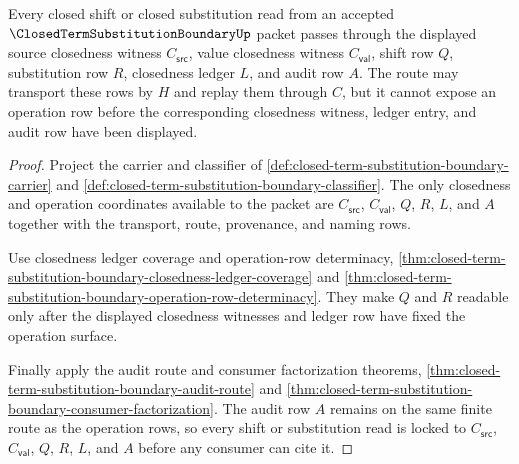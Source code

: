 \begin{theorem}
\label{thm:closed-term-substitution-boundary-shift-substitution-ledger-lock}
Every closed shift or closed substitution read from an accepted $\ClosedTermSubstitutionBoundaryUp$ packet passes through the displayed source closedness witness $C_{\mathsf{src}}$, value closedness witness $C_{\mathsf{val}}$, shift row $Q$, substitution row $R$, closedness ledger $L$, and audit row $A$. The route may transport these rows by $H$ and replay them through $C$, but it cannot expose an operation row before the corresponding closedness witness, ledger entry, and audit row have been displayed.
\end{theorem}
\begin{proof}
Project the carrier and classifier of \autoref{def:closed-term-substitution-boundary-carrier} and \autoref{def:closed-term-substitution-boundary-classifier}. The only closedness and operation coordinates available to the packet are $C_{\mathsf{src}}$, $C_{\mathsf{val}}$, $Q$, $R$, $L$, and $A$ together with the transport, route, provenance, and naming rows.

Use closedness ledger coverage and operation-row determinacy, \autoref{thm:closed-term-substitution-boundary-closedness-ledger-coverage} and \autoref{thm:closed-term-substitution-boundary-operation-row-determinacy}. They make $Q$ and $R$ readable only after the displayed closedness witnesses and ledger row have fixed the operation surface.

Finally apply the audit route and consumer factorization theorems, \autoref{thm:closed-term-substitution-boundary-audit-route} and \autoref{thm:closed-term-substitution-boundary-consumer-factorization}. The audit row $A$ remains on the same finite route as the operation rows, so every shift or substitution read is locked to $C_{\mathsf{src}}$, $C_{\mathsf{val}}$, $Q$, $R$, $L$, and $A$ before any consumer can cite it.
\end{proof}

